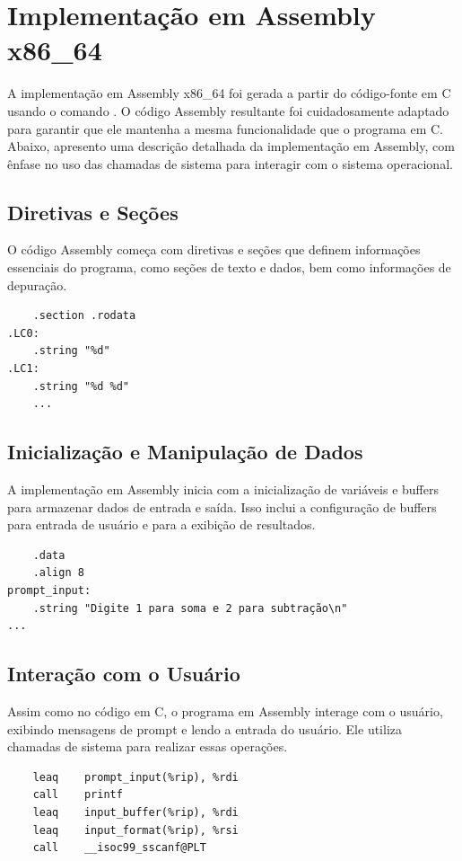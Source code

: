 \documentclass[
	12pt,				%
	openright,			%
	oneside,			%
	a4paper,			%
	chapter=TITLE,		%
	english,			%
	french,				%
	spanish,			%
	brazil				%
	]{abntex2}
\theoremstyle{definition}
\begin{document}
\section{Implementação em Assembly x86\_64}

A implementação em Assembly x86\_64 foi gerada a partir do código-fonte em C usando o comando 
. O código Assembly resultante foi cuidadosamente adaptado para garantir que ele 
mantenha a mesma funcionalidade que o programa em C. Abaixo, apresento uma descrição detalhada da 
implementação em Assembly, com ênfase no uso das chamadas de sistema para interagir com o sistema operacional.

\subsection{Diretivas e Seções}

O código Assembly começa com diretivas e seções que definem informações essenciais do programa, 
como seções de texto e dados, bem como informações de depuração.

\begin{verbatim}
    .section .rodata
.LC0:
    .string "%d"
.LC1:
    .string "%d %d"
    ...
\end{verbatim}

\subsection{Inicialização e Manipulação de Dados}

A implementação em Assembly inicia com a inicialização de variáveis e buffers para 
armazenar dados de entrada e saída. Isso inclui a configuração de buffers para entrada de 
usuário e para a exibição de resultados.

\begin{verbatim}
    .data
    .align 8
prompt_input:
    .string "Digite 1 para soma e 2 para subtração\n"
...
\end{verbatim}

\subsection{Interação com o Usuário}

Assim como no código em C, o programa em Assembly interage com o usuário, exibindo 
mensagens de prompt e lendo a entrada do usuário. Ele utiliza chamadas de sistema 
para realizar essas operações.

\begin{verbatim}
    leaq    prompt_input(%rip), %rdi
    call    printf
    leaq    input_buffer(%rip), %rdi
    leaq    input_format(%rip), %rsi
    call    __isoc99_sscanf@PLT
\end{verbatim}
\end{document}
